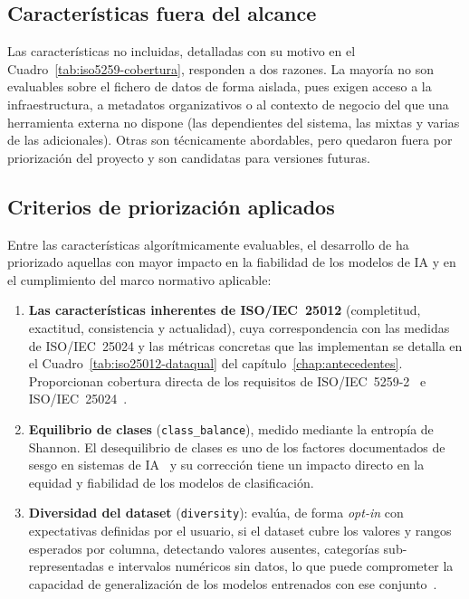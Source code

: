 \subsection{Características fuera del alcance}
\label{sec:caracteristicas-fuera-alcance}

Las características no incluidas, detalladas con su motivo en el
Cuadro~\ref{tab:iso5259-cobertura}, responden a dos razones.  La mayoría no
son evaluables sobre el fichero de datos de forma aislada, pues exigen acceso
a la infraestructura, a metadatos organizativos o al contexto de negocio del
que una herramienta externa no dispone (las dependientes del sistema, las
mixtas y varias de las adicionales).  Otras son técnicamente abordables, pero
quedaron fuera por priorización del proyecto y son candidatas para versiones
futuras.

\subsection{Criterios de priorización aplicados}
\label{sec:priorizacion-mvp}

Entre las características algorítmicamente evaluables, el desarrollo de
\dataqual ha priorizado aquellas con mayor impacto en la fiabilidad de los
modelos de \ac{IA} y en el cumplimiento del marco normativo aplicable:

\begin{enumerate}
  \item \textbf{Las características inherentes de \ac{ISO}/\ac{IEC}~25012}
    (completitud, exactitud, consistencia y actualidad), cuya correspondencia
    con las medidas de \ac{ISO}/\ac{IEC}~25024 y las métricas concretas que las
    implementan se detalla en el Cuadro~\ref{tab:iso25012-dataqual} del
    capítulo~\ref{chap:antecedentes}.  Proporcionan cobertura directa de los
    requisitos de \ac{ISO}/\ac{IEC}~5259-2~\citep{iso5259} e
    \ac{ISO}/\ac{IEC}~25024~\citep{iso25024}.

  \item \textbf{Equilibrio de clases} (\texttt{class\_balance}), medido
    mediante la entropía de Shannon.  El desequilibrio de clases es uno de
    los factores documentados de sesgo en sistemas de
    \ac{IA}~\citep{amazon2018, buolamwini2018} y su corrección tiene un
    impacto directo en la equidad y fiabilidad de los modelos de
    clasificación.

  \item \textbf{Diversidad del dataset} (\texttt{diversity}): evalúa, de
    forma \emph{opt-in} con expectativas definidas por el usuario, si el
    dataset cubre los valores y rangos esperados por columna, detectando
    valores ausentes, categorías sub-representadas e intervalos numéricos
    sin datos, lo que puede comprometer la capacidad de generalización de
    los modelos entrenados con ese conjunto~\citep{iso5259}.
\end{enumerate}

